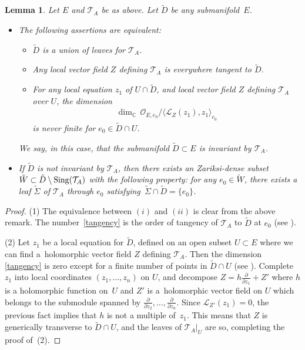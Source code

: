 \documentclass[10pt,a4paper]{amsart}
\newcommand{\der}[2]{\frac{\partial #1}{\partial#2}}
\numberwithin{equation}{section}
\newtheorem{Lemma}[Theorem]{Lemma}
\begin{document}
 \begin{Lemma}\label{invariantfoliation}\samepage Let $E$ and $\mathcal{T}_A$ be as above. Let $\tilde{D}$ be any submanifold~$E$.
 \begin{itemize}\itemsep=0pt \item[$(1)$] The following assertions are equivalent:
 \begin{itemize}\itemsep=0pt
\item[$(i)$] $\tilde{D}$ is a union of leaves for $\mathcal{T}_A$.
\item[$(ii)$] Any local vector field $Z$ defining $\mathcal{T}_A$ is everywhere tangent to $\tilde{D}$.
\item[$(iii)$] For any local equation $z_1$ of $U\cap \tilde{D}$, and local vector field $Z$ defining $\mathcal{T}_A$ over $U$, the dimension
 \begin{gather}\label{tangency} \dim_{\mathbb{C}}\, \mathcal{O}_{E,e_0}/\langle \mathcal{L}_{Z}(z_1), z_1 \rangle_{e_0} \end{gather}
is never finite for $e_0 \in \tilde{D}\cap U$.
\end{itemize}
We say, in this case, that the submanifold $\tilde{D}\subset E$ is \textit{invariant} by $\mathcal{T}_A$.
\item[$(2)$] If $\tilde{D}$ is not invariant by $\mathcal{T}_A$, then there exists an Zariksi-dense subset $\tilde{W}\subset \tilde{D}\setminus {\rm Sing}(\mathcal{T}_A)$ with the following property: for any $e_0\in \tilde{W}$, there exists a leaf $\tilde{\Sigma}$ of $\mathcal{T}_A$ through $e_0$ satisfying~$\tilde{\Sigma}\cap \tilde{D} = \{e_0\}$.
\end{itemize}
 \end{Lemma}
\begin{proof}
(1) The equivalence between $(i)$ and $(ii)$ is clear from the above remark. The number~\eqref{tangency} is the order of tangency of $\mathcal{T}_A$ to $\tilde{D}$ at $e_0$ (see \cite[p.~13]{Brunella}).

(2) Let $z_1$ be a local equation for $\tilde{D}$, defined on an open subset $U\subset E$ where we can find a~holomorphic vector field $Z$ defining $\mathcal{T}_A$. Then the dimension \eqref{tangency} is zero except for a finite number of points in $\tilde{D}\cap U$ (see \cite[p.~13]{Brunella}). Complete $z_1$ into local coordinates $(z_1,\dots,z_n)$ on $U$, and decompose $Z=h \der{}{z_1} + Z'$ where $h$ is a holomorphic function on~$U$ and $Z'$ is a~holomorphic vector field on $U$ which belongs to the submodule spanned by $\der{}{z_2},\dots,\der{}{z_n}$. Since $\mathcal{L}_{Z'}(z_1)=0$, the previous fact implies that $h$ is not a multiple of~$z_1$. This means that $Z$ is generically transverse to $\tilde{D}\cap U$, and the leaves of $\mathcal{T}_A\vert_U$ are so, completing the proof of~(2).
 \end{proof}
\end{document}
